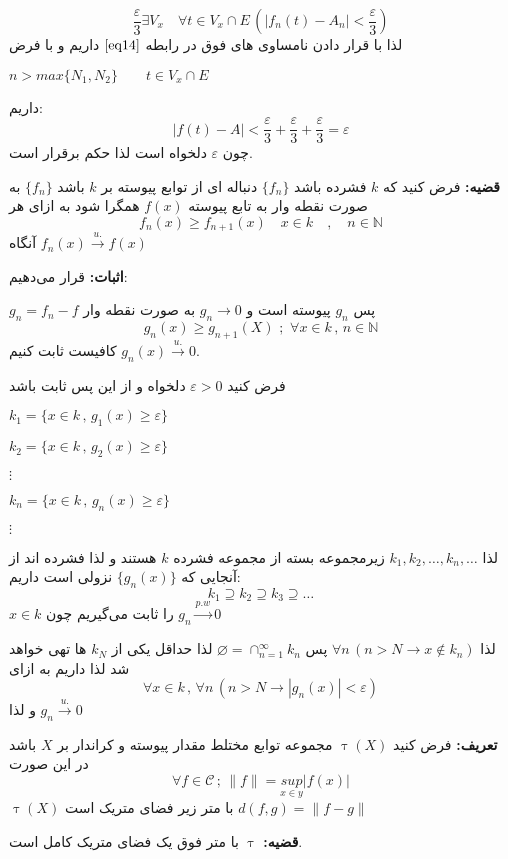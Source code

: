 \documentclass[12pt]{report}
\begin{document}
\[
\frac{\varepsilon}{3} \exists V_x \quad \forall t \in V_x \cap E\, (|f_n(t) - A_n| <\frac{\varepsilon}{3} )
\]
لذا با قرار دادن نامساوی های فوق در رابطه 
$\eqref{eq14}$
داریم و با فرض

$ n > max\{N_1 , N_2\} \qquad t \in V_x \cap E$

داریم:
\[
|f(t) - A| < \frac{\varepsilon}{3} + \frac{\varepsilon}{3} + \frac{\varepsilon}{3} = \varepsilon
\]
چون 
$\varepsilon$
دلخواه است لذا حکم برقرار است.

\textbf{قضیه:}
فرض کنید که
$k$
فشرده باشد
$\{f_n\}$
دنباله ای از توابع پیوسته بر 
$k$
باشد 
$\{f_n\}$
به صورت نقطه وار به تابع پیوسته 
$f(x)$
همگرا شود به ازای هر
\[
 f_n(x) \geq f_{n + 1}(x) \quad x \in k \quad, \quad n \in \mathbb{N}
\]
آنگاه 
$f_n(x)  \overset{u.}{\rightarrow} f(x)$

\textbf{اثبات:}
قرار می‌دهیم:

$g_n = f_n - f$
پس 
$g_n$
پیوسته است و 
$g_n \to 0$
به صورت نقطه وار 
\[
g_n(x) \geq g_{n+1}(X)\,\, ;\,\, \forall x \in k \, ,\, n \in \mathbb{N}
\]
کافیست ثابت کنیم
$g_n(x)  \overset{u.}{\rightarrow} 0$.

فرض کنید
$\varepsilon > 0$
دلخواه و از این پس ثابت باشد
\begin{center}
$k_1 = \{x \in k \, , \, g_1(x) \geq \varepsilon\}$

$k_2 = \{x \in k \, , \, g_2(x) \geq \varepsilon\}$

$\vdots$ 

$k_n = \{x \in k \, , \, g_n(x) \geq \varepsilon\}$

$\vdots$ 
\end{center}
لذا
$k_1 , k_2 , \dots , k_n , \dots$
زیرمجموعه بسته از مجموعه فشرده 
$k$
هستند و لذا فشرده اند از آنجایی که 
$\{g_n(x)\}$
نزولی است داریم:
\[
k_1 \supseteq k_2 \supseteq k_3 \supseteq \dots 
\]
$x\in k$
را ثابت می‌گیریم چون
$g_n  \overset{p.w}{\to} 0$

لذا 
$\forall n \,(n > N \rightarrow x \notin k _n)$
پس
$ \varnothing = \cap_{n = 1}^{\infty} k_n$
لذا حداقل یکی از 
$k_N$
ها تهی خواهد شد لذا داریم به ازای 
\[
\forall x\in k \,, \, \forall n \,(n > N \rightarrow |g_n(x)| < \varepsilon)
\]
و لذا 
$g_n  \overset{u.}{\to} 0$

\textbf{تعریف:}
فرض کنید 
$\uptau(X)$
مجموعه توابع مختلط مقدار پیوسته و کراندار بر
$X$
باشد در این صورت
\[
\forall f \in \mathcal{C} \,;\, \lVert f \rVert = \underset{x \in y}{sup}|f(x)|
\]
$\uptau(X)$
با متر زیر فضای متریک است
$d(f, g) = \lVert f - g \rVert$

\textbf{قضیه:}
$\uptau$
با متر فوق یک فضای متریک کامل است.
\end{document}
